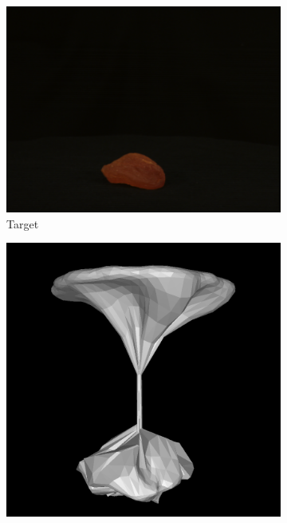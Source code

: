 \documentclass{article}
\begin{document}
\begin{figure}[h!]
  \centering
  \begin{subfigure}{.2\textwidth}
    \centering
    \includegraphics[width=\textwidth]{images/apricot.png}
    \caption{Target}
    \label{results-apricot-mesh1}
  \end{subfigure}
  \hfill
  \begin{subfigure}{.2\textwidth}
    \centering
    \includegraphics[width=\textwidth]{images/apricotmesh_a.png}

\end{subfigure}
\end{figure}
\end{document}
